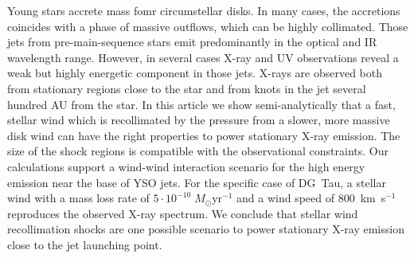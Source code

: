 Young stars accrete mass fomr circumstellar disks. In many cases, the accretions coincides with a phase of massive outflows, which can be highly collimated. Those jets from pre-main-sequence stars emit predominantly in the optical and IR wavelength range. However, in several cases X-ray and UV observations reveal a weak but highly energetic component in those jets. X-rays are observed both from stationary regions close to the star and from knots in the jet several hundred AU from the star. 
In this article we show semi-analytically that a fast, stellar wind which is recollimated by the pressure from a slower, more massive disk wind can have the right properties to power stationary X-ray emission. The size of the shock regions is compatible with the observational constraints. Our calculations support a wind-wind interaction scenario for the high energy emission near the base of YSO jets. For the specific case of DG~Tau, a stellar wind with a mass loss rate of $5\cdot10^{-10}\;M_{\odot}\mathrm{ yr}^{-1}$ and a wind speed of 800~km~s$^{-1}$ reproduces the observed X-ray spectrum.
We conclude that stellar wind recollimation shocks are one possible scenario to power stationary X-ray emission close to the jet launching point.
